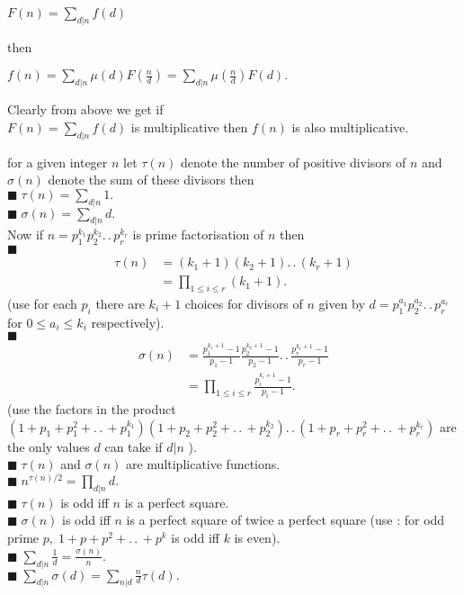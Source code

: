 \documentclass[11pt]{extarticle}
\newcommand{\ck}{.\,.\,}
\newcommand{\sm}[2]{\displaystyle\sum_{#1}^{#2}}
\newcommand{\snote}[1]{{\footnotesize(#1)}}
\newcommand{\tbx}[2][]{
\begin{tcolorbox}[enhanced,breakable,size=small,colback=black!2!white,title={#1},arc is angular, arc=1.5mm,
	drop fuzzy shadow]
	#2
\end{tcolorbox}
}
\newcommand{\y}{$\blacksquare\;$}
\begin{document}
\begin{multicols}{2}
{\begin{center}
 $  F(n)=\sm{d|n}{}f(d) $ 
 \end{center}

then 


\begin{center}
 $ f(n)=\sm{d|n}{} \mu(d)F(\frac{ n }{d})=\sm{d|n}{}\mu(\frac{ n }{d})F(d). $ 
 \end{center}
}
\tbx{
 Clearly from above we get if \\
$  F(n)=\sm{d|n}{}f(d) $ is multiplicative then $ f(n) $ is also multiplicative.}
\tbx[Positive Divisors function ]{  for a given integer $ n $ let $ \tau(n) $ denote the number of positive divisors of $ n $ and $ \sigma(n) $ denote the sum of these divisors then \\
\y$ \tau(n)=\sm{d|n}{}1. $ \\
\y $ \sigma(n)=\sm{d|n}{}d. $ \\
Now if $ n=p_1^{k_1}p_2^{k_2}\ck p_r^{k_r} $ is prime factorisation of $ n $ then \\
\y\begin{align*}
	\tau(n)&=(k_1+1)(k_2+1)\ck (k_r+1)\\
	&=\displaystyle\prod_{1\leq i\leq r}(k_1+1). 
\end{align*}
\snote{use for each $ p_i $ there are $ k_i+1 $ choices for divisors of $ n $ given by $ d=p_1^{a_1}p_2^{a_2}\ck p_r^{a_r} $ for $ 0\leq a_i \leq k_i $ respectively}. \\
\y \begin{align*}
	\sigma(n)&=\frac{ p_1^{k_1+1}-1 }{p_1-1} \frac{ p_2^{k_2+1}-1 }{p_2-1}\ck \frac{ p_r^{k_r+1}-1 }{p_r-1}\\
	& = \prod\limits_{1\leq i \leq r}^{}\frac{ p_i^{k_i+1}-1 }{p_i-1}.
\end{align*}
\snote{use the factors in the product  $ (1+p_1+p_1^2+\ck +p_1^{k_1})(1+p_2+p_2^2+\ck +p_2^{k_2})\ck (1+p_r+p_r^2+\ck +p_r^{k_r})   $ are the only values $ d $ can take if $ d|n $ }.\\
\y $ \tau(n) $ and $ \sigma(n) $ are multiplicative functions.\\
\y $ n^{\tau(n)/2} =\prod\limits_{d|n}^{} d.$ \\
\y $ \tau(n) $ is odd iff $ n $ is a perfect square.\\
\y $ \sigma(n) $ is odd iff $ n $ is a perfect square of twice a perfect square \snote{use : for odd prime $ p,\; 1+p+p^2+\ck +p^k $ is odd iff $ k $ is even}.\\
\y $ \sm{d|n}{}\frac{ 1 }{d} =\frac{ \sigma(n) }{n} . $ \\
\y $ \sm{d|n}{}\sigma(d)=\sm{n|d}{}\frac{ n }{d} \tau(d). $ }


\end{multicols}
\end{document}

